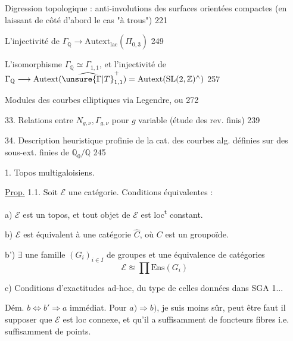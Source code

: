  Digression topologique : anti-involutions des surfaces
orientées compactes (en laissant de côté d'abord le cas "à trous")
\hfill 221

 L'injectivité de
\(\Gamma_{\mathbb Q}\longrightarrow
\mathrm{Autext}_{\mathrm{lac}}(\widehat{\Pi}_{0,3})\)
\hfill 249

 L'isomorphisme
\(\Gamma_{\mathbb Q}\simeq\Gamma_{1,1}\),
et l'injectivité de
\(\Gamma_{\mathbb Q}\longrightarrow
\mathrm{Autext}(\widehat{\unsure{\Gamma|T}}_{1,1}^{+})
=\mathrm{Autext}(\mathrm{SL}(2,\mathbb Z)^{\wedge})\)
\hfill 257

 Modules des courbes elliptiques via Legendre, ou
 \hfill 272

33. Relations entre \(N_{g,\nu},\Gamma_{g,\nu}\) pour \(g\)
variable (étude des rev. finis) \hfill 239

34. Description heuristique profinie de la cat. des courbes alg.
définies sur des 
sous-ext. finies de \(\mathbb Q_0/\mathbb Q\)
\hfill 245




1. Topos multigaloisiens.

\uline{Prop.} 1.1. Soit \(\mathcal E\) une catégorie.
Conditions équivalentes :

a) \(\mathcal E\) est un topos, et tout objet de \(\mathcal E\)
est loc\textsuperscript{t} constant.

b) \(\mathcal E\) est équivalent à une catégorie \(\widehat C\),
où \(C\) est un groupoïde.


b') \(\exists\) une famille \((G_i)_{i\in I}\) de groupes
et une équivalence de catégories
\[
\mathcal E\approxeq\prod\mathrm{Ens}(G_i)
\]

c) Conditions d'exactitudes ad-hoc, du type de celles données dans SGA 1...

Dém. \(b\Longleftrightarrow b'\Longrightarrow a\) immédiat.
Pour \(a)\Longrightarrow b)\), je suis moins sûr, peut être faut il
supposer que \(\mathcal E\) est loc connexe, et qu'il a suffisamment
de foncteurs fibres i.e. suffisamment de points.

